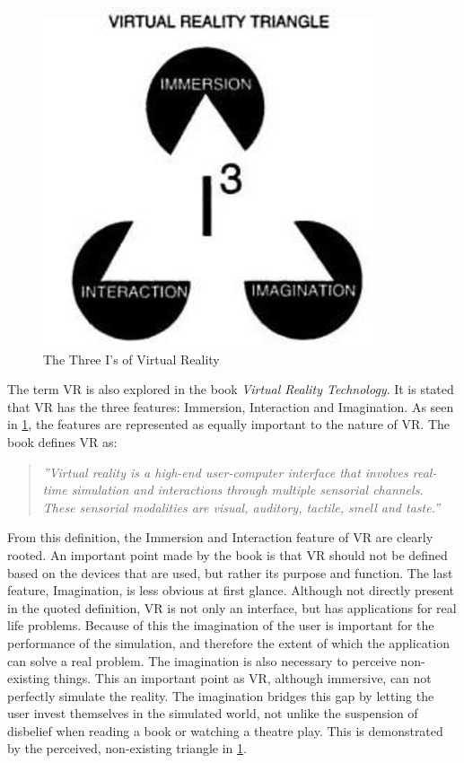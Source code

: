                 \FloatBarrier
                \begin{figure}[htbp]
                    \centering
                    \includegraphics[width=0.5\linewidth]{figures/three_i.png}
                    \caption{The Three I's of Virtual Reality}
                    \label{fig:three_i}
                \end{figure}
                \FloatBarrier
                
                The term VR is also explored in the book \emph{Virtual Reality Technology}\cite{threei}. It is stated that VR has the three features: Immersion, Interaction and Imagination. As seen in \cref{fig:three_i}, the features are represented as equally important to the nature of VR. The book defines VR as:
                
                \begin{quote}
                    \textit{''Virtual reality is a high-end user-computer interface that involves real-time simulation and interactions through multiple sensorial channels. These sensorial modalities are visual, auditory, tactile, smell and taste.''}
                \end{quote}
                
                From this definition, the Immersion and Interaction feature of VR are clearly rooted. An important point made by the book is that VR should not be defined based on the devices that are used, but rather its purpose and function. The last feature, Imagination, is less obvious at first glance. Although not directly present in the quoted definition, VR is not only an interface, but has applications for real life problems. Because of this the imagination of the user is important for the performance of the simulation, and therefore the extent of which the application can solve a real problem. The imagination is also necessary to perceive non-existing things. This an important point as VR, although immersive, can not perfectly simulate the reality. The imagination bridges this gap by letting the user invest themselves in the simulated world, not unlike the suspension of disbelief when reading a book or watching a theatre play. This is demonstrated by the perceived, non-existing triangle in \cref{fig:three_i}.
                
